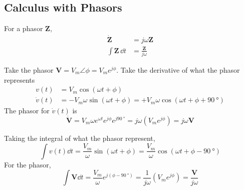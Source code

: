 \documentclass{article}
\begin{document}
\subsection{Calculus with Phasors}
\begin{proposition}
    For a phasor $\mathbf Z$,
    \begin{align}
        \dot{\mathbf Z}&=j\omega\mathbf Z\\
        \int \mathbf Z\, \dd t&=\frac{\mathbf Z}{j\omega}
    \end{align}
\end{proposition}
\begin{prooof}
    Take the phasor $\mathbf{V}=V_m\angle\phi=V_m e^{j\phi}$. Take the derivative of what the phasor represents
    \begin{align}
        v(t)&=V_m\cos(\omega t+\phi)\\
        \dot v(t)&=-V_m\omega\sin(\omega t+\phi)=+V_m\omega\cos(\omega t+\phi+\SI{90}{\degree})
    \end{align}
    The phasor for $\dot v(t)$ is
    \begin{equation}
        \dot{\mathbf{V}}=V_m\omega e^{\omega t}e^{j\phi}e^{j\SI{90}{\degree}}=j\omega (V_me^{j\phi})=j\omega\mathbf V
    \end{equation} 

    Taking the integral of what the phasor represent,
    \begin{equation}
        \int v(t)\dd t=\frac{V_m}{\omega}\sin(\omega t+\phi)=\frac{V_m}{\omega}\cos(\omega t+\phi-\SI{90}{\degree})
    \end{equation}
    For the phasor, 
    \begin{equation}
        \int \mathbf{V}\dd t=\frac{V_m}{\omega}e^{j(\phi-\SI{90}{\degree})}=\frac{1}{j\omega}(V_me^{j\phi})=\frac{\mathbf V}{j\omega}
    \end{equation}
\end{prooof}
\end{document}
